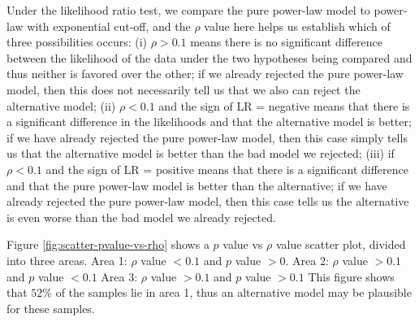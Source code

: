 \documentclass[paper]{ieice}
\begin{document}
Under the likelihood ratio test, we compare the pure power-law model to power-law with exponential cut-off, and the $\rho$ value here helps us establish which of three possibilities occurs: (i) $\rho > 0.1$ means there is no significant difference between the likelihood of the data under the two hypotheses being compared and thus neither is favored over the other; if we already rejected the pure power-law model, then this does not necessarily tell us that we also can reject the alternative model; (ii) $\rho  < 0.1$ and the sign of LR = negative means that there is a significant difference in the likelihoods and that the alternative model is better; if we have already rejected the pure power-law model, then this case simply tells us that the alternative model is better than the bad model we rejected; (iii) if $\rho < 0.1$ and the sign of LR = positive means that there is a significant difference and that the pure power-law model is better than the alternative; if we have already rejected the pure power-law model, then this case tells us the alternative is even worse than the bad model we already rejected.

Figure \ref{fig:scatter-pvalue-vs-rho} shows a $p$ value vs $\rho$ value scatter plot, divided into three areas.
Area 1: $\rho$ value $<0.1$ and $p$ value $>0$. 
Area 2: $\rho$ value $>0.1$ and $p$ value $<0.1$
Area 3: $\rho$ value $>0.1$ and  $p$ value $>0.1$ 
This figure shows that $52\%$ of the samples lie in area 1, thus an alternative model may be plausible for these samples.
\end{document}
